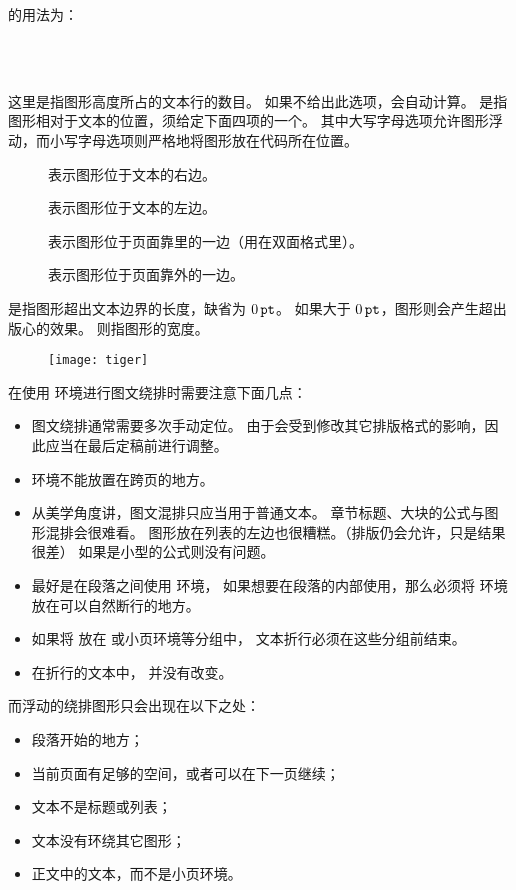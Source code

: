 的用法为：
\begin{flushleft}
	\\
	\qquad{}\\
\end{flushleft}

这里是指图形高度所占的文本行的数目。
如果不给出此选项，会自动计算。
是指图形相对于文本的位置，须给定下面四项的一个。
其中大写字母选项允许图形浮动，而小写字母选项则严格地将图形放在代码所在位置。
\begin{description}
	\item [] 表示图形位于文本的右边。
	\item [] 表示图形位于文本的左边。
	\item [] 表示图形位于页面靠里的一边（用在双面格式里）。
	\item [] 表示图形位于页面靠外的一边。
\end{description}
是指图形超出文本边界的长度，缺省为 $0\,\mathtt{pt}$。
如果大于 $0\,\mathtt{pt}$，图形则会产生超出版心的效果。
则指图形的宽度。

\begin{wrapfigure}{r}{4.5cm}
	\texttt{[image: tiger]}
\end{wrapfigure}
在使用  环境进行图文绕排时需要注意下面几点：
\begin{itemize}
	\item 图文绕排通常需要多次手动定位。
	由于会受到修改其它排版格式的影响，因此应当在最后定稿前进行调整。
	\item {} 环境不能放置在跨页的地方。
	\item 从美学角度讲，图文混排只应当用于普通文本。
	章节标题、大块的公式与图形混排会很难看。
	图形放在列表的左边也很糟糕。（排版仍会允许，只是结果很差）
	如果是小型的公式则没有问题。
	\item 最好是在段落之间使用  环境，
	如果想要在段落的内部使用，那么必须将  环境放在可以自然断行的地方。
	\item 如果将  放在  或小页环境等分组中，
	文本折行必须在这些分组前结束。
	\item 在折行的文本中， 并没有改变。
\end{itemize}

而浮动的绕排图形只会出现在以下之处：
\begin{itemize}
	\item 段落开始的地方；
	\item 当前页面有足够的空间，或者可以在下一页继续；
	\item 文本不是标题或列表；
	\item 文本没有环绕其它图形；
	\item 正文中的文本，而不是小页环境。
\end{itemize}

